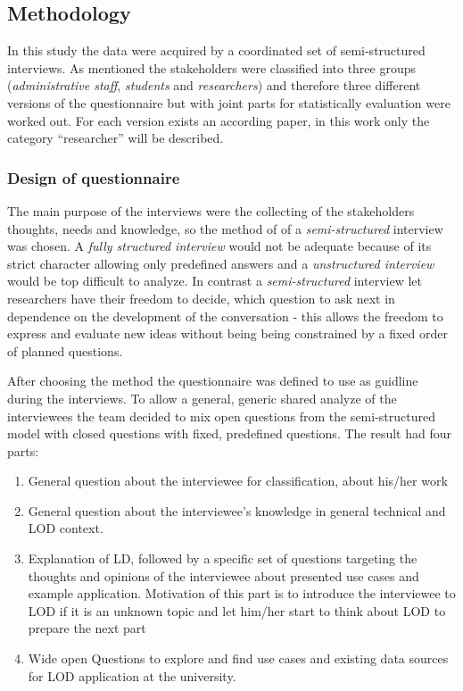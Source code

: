 \subsection{Methodology}\label{methodology}
In this study the data were acquired by a coordinated set of semi-structured interviews. As mentioned the stakeholders were classified into three groups (\textit{administrative staff}, \textit{students} and \textit{researchers}) and therefore three different versions of the questionnaire but with joint parts for statistically evaluation were worked out. For each version exists an according paper, in this work only the category ``researcher'' will be described.

\subsubsection{Design of questionnaire}
The main purpose of the interviews were the collecting of the stakeholders thoughts, needs and knowledge, so the method of of a \textit{semi-structured} interview was chosen. A \textit{fully structured interview} would not be adequate because of its strict character allowing only predefined answers and a \textit{unstructured interview} would be top difficult to analyze. In contrast a \textit{semi-structured} interview let researchers have their freedom to decide, which question to ask next in dependence on the development of the conversation - this allows the freedom to express and evaluate new ideas without being being constrained by a
fixed order of planned questions.

After choosing the method the questionnaire was defined to use as guidline during the interviews. To allow a general, generic shared analyze of the interviewees the team decided to mix open questions from the semi-structured model with closed questions with fixed, predefined questions. The result had four parts:

\begin{enumerate}
	\item General question about the interviewee for classification, about his/her work
	\item General question about the interviewee's knowledge in general technical and LOD context.
	\item Explanation of LD, followed by a specific set of questions targeting the thoughts and opinions of the interviewee about presented use cases and example application. Motivation of this part is to introduce the interviewee to LOD if it is an unknown topic and let him/her start to think about LOD to prepare the next part
	\item Wide open Questions to explore and find use cases and existing data sources for LOD application at the university.
\end{enumerate}


